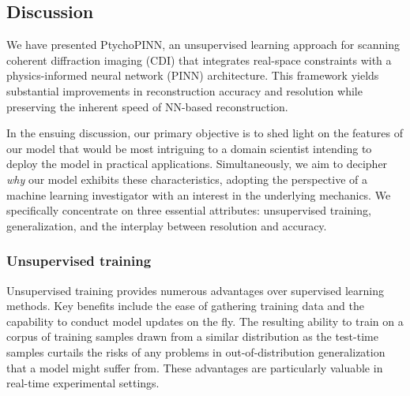 \documentclass[sn-mathphys]{sn-jnl}%
\theoremstyle{thmstyleone}%
\theoremstyle{thmstyletwo}%
\theoremstyle{thmstylethree}%
\begin{document}

\subsection{Discussion}
We have presented PtychoPINN, an unsupervised learning approach for scanning coherent diffraction imaging (CDI) that integrates real-space constraints with a physics-informed neural network (PINN) architecture. This framework yields substantial improvements in reconstruction accuracy and resolution while preserving the inherent speed of NN-based reconstruction. 


In the ensuing discussion, our primary objective is to shed light on the features of our model that would be most intriguing to a domain scientist intending to deploy the model in practical applications. Simultaneously, we aim to decipher \emph{why} our model exhibits these characteristics, adopting the perspective of a machine learning investigator with an interest in the underlying mechanics. We specifically concentrate on three essential attributes: unsupervised training, generalization, and the interplay between resolution and accuracy.

\subsubsection{Unsupervised training} 
Unsupervised training provides numerous advantages over supervised learning methods. Key benefits include the ease of gathering training data and the capability to conduct model updates on the fly. The resulting ability to train on a corpus of training samples drawn from a similar distribution as the test-time samples curtails the risks of any problems in out-of-distribution generalization that a model might suffer from. These advantages are particularly valuable in real-time experimental settings.
\end{document}
